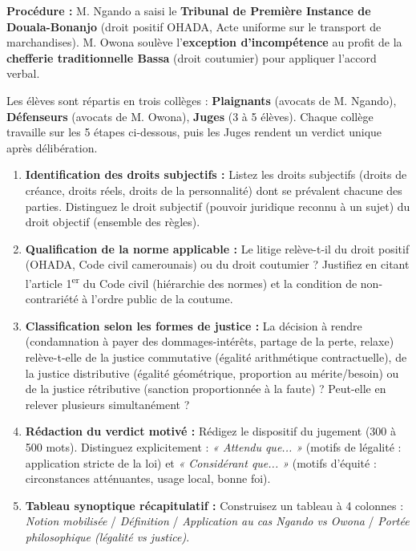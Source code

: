 \documentclass[11pt]{article}
\newcommand{\cle}[1]{{\popxbold\color{popdark}#1}}
\newcounter{popsec}
\newcounter{popsub}
\newcommand{\courssub}[1]{%
  \stepcounter{popsub}%
  \par\vspace{9pt}\noindent{\popxbold\fontsize{11.5}{13}\selectfont\color{popink}{\color{poporange}\thepopsec.\thepopsub}\hspace{6pt}#1}\par\nopagebreak\vspace{4pt}
}
\begin{document}
\textbf{Procédure :} M. Ngando a saisi le \textbf{Tribunal de Première Instance de Douala-Bonanjo} (droit positif OHADA, Acte uniforme sur le transport de marchandises). M. Owona soulève l'\textbf{exception d'incompétence} au profit de la \textbf{chefferie traditionnelle Bassa} (droit coutumier) pour appliquer l'accord verbal.

\courssub{Consignes}
Les élèves sont répartis en trois collèges : \textbf{Plaignants} (avocats de M. Ngando), \textbf{Défenseurs} (avocats de M. Owona), \textbf{Juges} (3 à 5 élèves). Chaque collège travaille sur les 5 étapes ci-dessous, puis les Juges rendent un verdict unique après délibération.

\begin{enumerate}
    \item \textbf{Identification des droits subjectifs :} Listez les \cle{droits subjectifs} (droits de créance, droits réels, droits de la personnalité) dont se prévalent chacune des parties. Distinguez le \cle{droit subjectif} (pouvoir juridique reconnu à un sujet) du \cle{droit objectif} (ensemble des règles).
    \item \textbf{Qualification de la norme applicable :} Le litige relève-t-il du \cle{droit positif} (OHADA, Code civil camerounais) ou du \cle{droit coutumier} ? Justifiez en citant l'article 1\textsuperscript{er} du Code civil (hiérarchie des normes) et la condition de \cle{non-contrariété à l'ordre public} de la coutume.
    \item \textbf{Classification selon les formes de justice :} La décision à rendre (condamnation à payer des dommages-intérêts, partage de la perte, relaxe) relève-t-elle de la \cle{justice commutative} (égalité arithmétique contractuelle), de la \cle{justice distributive} (égalité géométrique, proportion au mérite/besoin) ou de la \cle{justice rétributive} (sanction proportionnée à la faute) ? Peut-elle en relever plusieurs simultanément ?
    \item \textbf{Rédaction du verdict motivé :} Rédigez le dispositif du jugement (300 à 500 mots). Distinguez explicitement : \textit{« Attendu que... »} (motifs de \cle{légalité} : application stricte de la loi) et \textit{« Considérant que... »} (motifs d'\cle{équité} : circonstances atténuantes, usage local, bonne foi).
    \item \textbf{Tableau synoptique récapitulatif :} Construisez un tableau à 4 colonnes : \textit{Notion mobilisée} / \textit{Définition} / \textit{Application au cas Ngando vs Owona} / \textit{Portée philosophique (légalité vs justice)}.
\end{enumerate}
\end{document}
